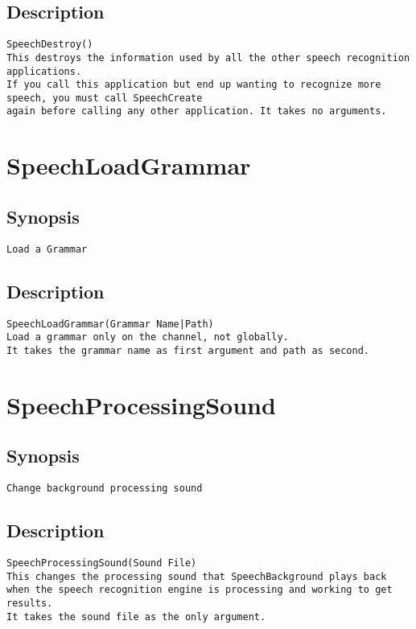 \subsection{Description}
\begin{verbatim}
SpeechDestroy()
This destroys the information used by all the other speech recognition applications.
If you call this application but end up wanting to recognize more speech, you must call SpeechCreate
again before calling any other application. It takes no arguments.

\end{verbatim}


\section{SpeechLoadGrammar}
\subsection{Synopsis}
\begin{verbatim}
Load a Grammar
\end{verbatim}
\subsection{Description}
\begin{verbatim}
SpeechLoadGrammar(Grammar Name|Path)
Load a grammar only on the channel, not globally.
It takes the grammar name as first argument and path as second.

\end{verbatim}


\section{SpeechProcessingSound}
\subsection{Synopsis}
\begin{verbatim}
Change background processing sound
\end{verbatim}
\subsection{Description}
\begin{verbatim}
SpeechProcessingSound(Sound File)
This changes the processing sound that SpeechBackground plays back when the speech recognition engine is processing and working to get results.
It takes the sound file as the only argument.

\end{verbatim}



